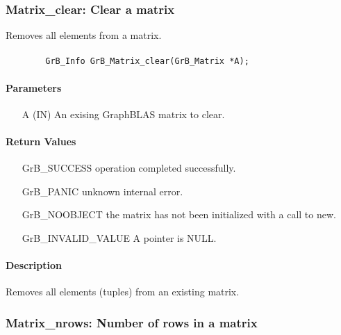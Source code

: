 \subsubsection{{\sf Matrix\_clear}: Clear a matrix}

Removes all elements from a matrix.

\paragraph{\syntax}

\begin{verbatim}
        GrB_Info GrB_Matrix_clear(GrB_Matrix *A);
\end{verbatim}

\paragraph{Parameters}

\begin{itemize}[leftmargin=1.1in]
    \item[{\sf A}] ({\sf IN}) An exising GraphBLAS matrix to clear.
\end{itemize}

\paragraph{Return Values}

\begin{itemize}[leftmargin=2.1in]
\item[{\sf GrB\_SUCCESS}]   operation completed successfully.
\item[{\sf GrB\_PANIC}]     unknown internal error.
\item[{\sf GrB\_NOOBJECT}]  the matrix has not been initialized with a call to new.
\item[{\sf GrB\_INVALID\_VALUE}]    {\sf A} pointer is {\sf NULL}.
\end{itemize}

\paragraph{Description}

Removes all elements (tuples) from an existing matrix.

\subsubsection{{\sf Matrix\_nrows}: Number of rows in a matrix}

